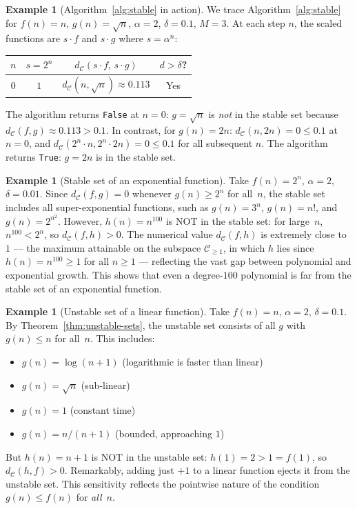 \documentclass[11pt,a4paper]{article}
\theoremstyle{plain}
\theoremstyle{definition}
\newtheorem{exampleinner}[theoreminner]{Example}
\newenvironment{example}[1][]{\begin{exampleinner}[#1]}{\end{exampleinner}}
\newcommand{\C}{\mathcal{C}}
\begin{document}
\begin{example}[Algorithm~\ref{alg:stable} in action]\label{ex:alg-stable-trace}
We trace Algorithm~\ref{alg:stable} for $f(n)=n$, $g(n)=\sqrt{n}$,
$\alpha=2$, $\delta=0.1$, $M=3$.  At each step $n$, the scaled
functions are $s\cdot f$ and $s\cdot g$ where $s=\alpha^n$:
\begin{center}
\begin{tabular}{cccc}
\hline
$n$ & $s=2^n$ & $d_\C(s\cdot f,\, s\cdot g)$ & $d>\delta$? \\\hline
$0$ & $1$ & $d_\C(n,\sqrt{n})\approx 0.113$ & Yes \\
\hline
\end{tabular}
\end{center}
The algorithm returns \texttt{False} at $n=0$: $g=\sqrt{n}$ is
\emph{not} in the stable set because $d_\C(f,g)\approx 0.113>0.1$.
In contrast, for $g(n)=2n$: $d_\C(n,2n)=0\le 0.1$ at $n=0$, and
$d_\C(2^n \cdot n, 2^n\cdot 2n)=0\le 0.1$ for all subsequent $n$.
The algorithm returns \texttt{True}: $g=2n$ is in the stable set.
\end{example}

\begin{example}[Stable set of an exponential function]\label{ex:stable-exp}
Take $f(n)=2^n$, $\alpha=2$, $\delta=0.01$.  Since $d_\C(f,g)=0$
whenever $g(n)\ge 2^n$ for all~$n$, the stable set includes all
super-exponential functions, such as $g(n)=3^n$, $g(n)=n!$, and
$g(n)=2^{n^2}$.  However, $h(n)=n^{100}$ is NOT in the stable set:
for large~$n$, $n^{100}<2^n$, so $d_\C(f,h)>0$.  The numerical
value $d_\C(f,h)$ is extremely close to~$1$ --- the maximum
attainable on the subspace $\C_{\ge 1}$, in which $h$ lies since
$h(n)=n^{100}\ge 1$ for all $n\ge 1$ --- reflecting the vast gap
between polynomial and exponential growth.  This shows
that even a degree-$100$ polynomial is far from the stable set of an
exponential function.
\end{example}

\begin{example}[Unstable set of a linear function]\label{ex:unstable-linear}
Take $f(n)=n$, $\alpha=2$, $\delta=0.1$.  By
Theorem~\ref{thm:unstable-sets}, the unstable set consists of all
$g$ with $g(n)\le n$ for all~$n$.  This includes:
\begin{itemize}
\item $g(n)=\log(n+1)$ (logarithmic is faster than linear)
\item $g(n)=\sqrt{n}$ (sub-linear)
\item $g(n)=1$ (constant time)
\item $g(n)=n/(n+1)$ (bounded, approaching $1$)
\end{itemize}
But $h(n)=n+1$ is NOT in the unstable set: $h(1)=2>1=f(1)$, so
$d_\C(h,f)>0$.  Remarkably, adding just $+1$ to a linear function
ejects it from the unstable set.  This sensitivity reflects the
pointwise nature of the condition $g(n)\le f(n)$ for \emph{all}~$n$.
\end{example}
\end{document}

